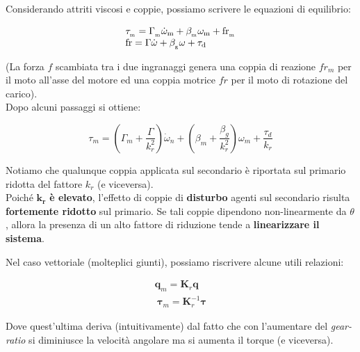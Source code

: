 Considerando attriti viscosi e coppie, possiamo scrivere le equazioni di equilibrio:

$$
\begin{array}{l c r}
	{\tau_{_\mathrm{m}}=\Gamma_{_\mathrm{m}}\dot{\omega}_{\mathrm{m}}+\beta_{_\mathrm{m}}\omega_{\mathrm{m}}+\mathrm{fr}_{_{\mathrm{m}}}}\\ {\mathrm{fr}=\Gamma\dot{\omega}+\beta_{_\mathrm{g}}\omega+\tau_{\mathrm{d}}}
\end{array}
$$

(La forza $f$ scambiata tra i due ingranaggi genera una coppia di reazione $fr_m$ per il moto all'asse del motore ed una coppia motrice $fr$ per il moto di rotazione del carico).\\
Dopo alcuni passaggi si ottiene:

$$
\tau_m = \left( \Gamma_m + \frac{\Gamma}{k_r^2} \right) \dot{\omega}_n
+
\left( \beta_m + \frac{\beta_g}{k_r^2} \right)\omega_m
+
\frac{\tau_d}{k_r}
$$

Notiamo che qualunque coppia applicata sul secondario è riportata sul primario ridotta del fattore $k_r$ (e viceversa). \\
Poiché $\mathbf{k_r}$ \textbf{è elevato}, l’effetto di coppie di \textbf{disturbo} agenti sul secondario risulta \textbf{fortemente ridotto} sul primario. Se tali coppie dipendono non-linearmente da $\theta$, allora la presenza di un alto fattore di riduzione tende a \textbf{linearizzare il sistema}.

Nel caso vettoriale (molteplici giunti), possiamo riscrivere alcune utili relazioni:

\begin{align}
	\mathbf{q}_m = \mathbf{K}_r\mathbf{q} \label{eq:trasmission_reduction}\\\
	\boldsymbol{\tau}_m = \mathbf{K}_r^{-1} \boldsymbol{\tau} \label{eq:trasmission_reduction_torque}
\end{align}

Dove quest'ultima deriva (intuitivamente) dal fatto che con l'aumentare del \textit{gear-ratio} si diminiusce la velocità angolare ma si aumenta il torque (e viceversa).




